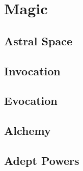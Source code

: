 \chapter{Magic}

\section{Astral Space}
\section{Invocation}
\section{Evocation}
\section{Alchemy}
\section{Adept Powers}